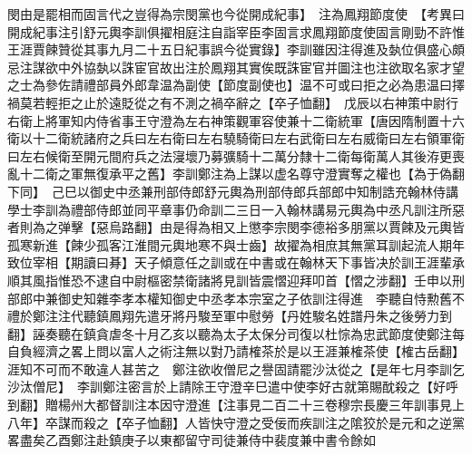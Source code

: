 閔由是罷相而固言代之豈得為宗閔黨也今從開成紀事】　注為鳳翔節度使　【考異曰開成紀事注引舒元輿李訓俱擢相庭注自詣宰臣李固言求鳳翔節度使固言剛勁不許惟王涯賈餗贊從其事九月二十五日紀事誤今從實錄】李訓雖因注得進及埶位俱盛心頗忌注謀欲中外協埶以誅宦官故出注於鳳翔其實俟既誅宦官并圖注也注欲取名家才望之士為參佐請禮部員外郎韋温為副使【節度副使也】温不可或曰拒之必為患温曰擇禍莫若輕拒之止於遠貶從之有不測之禍卒辭之【卒子恤翻】　戊辰以右神策中尉行右衛上將軍知内侍省事王守澄為左右神策觀軍容使兼十二衛統軍【唐因隋制置十六衛以十二衛統諸府之兵曰左右衛曰左右驍騎衛曰左右武衛曰左右威衛曰左右領軍衛曰左右候衛至開元間府兵之法寖壞乃募彍騎十二萬分隸十二衛每衛萬人其後洊更喪亂十二衛之軍無復承平之舊】李訓鄭注為上謀以虚名尊守澄實奪之權也【為于偽翻下同】　己巳以御史中丞兼刑部侍郎舒元輿為刑部侍郎兵部郎中知制誥充翰林侍講學士李訓為禮部侍郎並同平章事仍命訓二三日一入翰林講易元輿為中丞凡訓注所惡者則為之弹擊【惡烏路翻】由是得為相又上懲李宗閔李德裕多朋黨以賈餗及元輿皆孤寒新進【餗少孤客江淮間元輿地寒不與士齒】故擢為相庶其無黨耳訓起流人期年致位宰相【期讀曰朞】天子傾意任之訓或在中書或在翰林天下事皆决於訓王涯輩承順其風指惟恐不逮自中尉樞密禁衛諸將見訓皆震慴迎拜叩首【慴之涉翻】壬申以刑部郎中兼御史知雜李孝本權知御史中丞孝本宗室之子依訓注得進　李聽自恃勲舊不禮於鄭注注代聽鎮鳳翔先遣牙將丹駿至軍中慰勞【丹姓駿名姓譜丹朱之後勞力到翻】誣奏聽在鎮貪虐冬十月乙亥以聽為太子太保分司復以杜悰為忠武節度使鄭注每自負經濟之畧上問以富人之術注無以對乃請榷茶於是以王涯兼榷茶使【榷古岳翻】涯知不可而不敢違人甚苦之　鄭注欲收僧尼之譽固請罷沙汰從之【是年七月李訓乞沙汰僧尼】　李訓鄭注密言於上請除王守澄辛巳遣中使李好古就第賜酖殺之【好呼到翻】贈楊州大都督訓注本因守澄進【注事見二百二十三卷穆宗長慶三年訓事見上八年】卒謀而殺之【卒子恤翻】人皆快守澄之受佞而疾訓注之隂狡於是元和之逆黨畧盡矣乙酉鄭注赴鎮庚子以東都留守司徒兼侍中裴度兼中書令餘如

